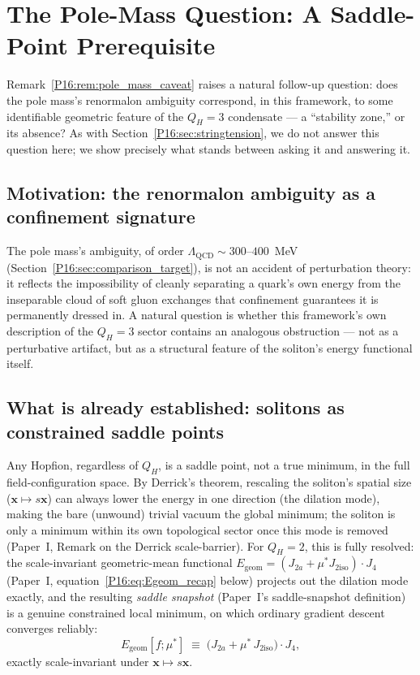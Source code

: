 \documentclass[11pt,a4paper]{article}
\theoremstyle{definition}\newtheorem{definition}[theorem]{Definition}
\theoremstyle{remark}
\theoremstyle{definition}\newtheorem{construction}[theorem]{Construction}
\newcommand{\Ja}{J_{2a}}
\newcommand{\Jfour}{J_4}
\newcommand{\ms}{\mu^*}
\newcommand{\QH}{Q_H}
\newcommand{\Jiso}{J_{2\mathrm{iso}}}
\begin{document}
\section{The Pole-Mass Question: A Saddle-Point Prerequisite}
\label{P16:sec:saddle_prerequisite}

Remark~\ref{P16:rem:pole_mass_caveat} raises a natural follow-up question:
does the pole mass's renormalon ambiguity correspond, in this
framework, to some identifiable geometric feature of the $\QH=3$
condensate --- a ``stability zone,'' or its absence? As with
Section~\ref{P16:sec:stringtension}, we do not answer this question here;
we show precisely what stands between asking it and answering it.

\subsection{Motivation: the renormalon ambiguity as a confinement
  signature}

The pole mass's ambiguity, of order $\Lambda_{\mathrm{QCD}}\sim300$--$400$~MeV
(Section~\ref{P16:sec:comparison_target}), is not an accident of
perturbation theory: it reflects the impossibility of cleanly
separating a quark's own energy from the inseparable cloud of soft
gluon exchanges that confinement guarantees it is permanently dressed
in. A natural question is whether this framework's own description
of the $\QH=3$ sector contains an analogous obstruction --- not as a
perturbative artifact, but as a structural feature of the soliton's
energy functional itself.

\subsection{What is already established: solitons as constrained
  saddle points}

Any Hopfion, regardless of $\QH$, is a saddle point, not a true
minimum, in the full field-configuration space. By Derrick's theorem,
rescaling the soliton's spatial size ($\mathbf{x}\mapsto s\mathbf{x}$)
can always lower the energy in one direction (the dilation mode),
making the bare (unwound) trivial vacuum the global minimum; the soliton is only a
minimum within its own topological sector once this mode is removed
(Paper~I, Remark on the Derrick scale-barrier). For $\QH=2$, this is
fully resolved: the scale-invariant geometric-mean functional
$E_{\mathrm{geom}}=(\Ja+\ms\Jiso)\cdot\Jfour$ (Paper~I,
equation~\eqref{P16:eq:Egeom_recap} below) projects out the dilation mode
exactly, and the resulting \emph{saddle snapshot}
(Paper~I's saddle-snapshot definition) is a genuine constrained
local minimum, on which ordinary gradient descent converges reliably:
\begin{equation}
  E_{\mathrm{geom}}[f;\ms] \;\equiv\; \bigl(\Ja+\ms\,\Jiso\bigr)\cdot\Jfour,
  \label{P16:eq:Egeom_recap}
\end{equation}
exactly scale-invariant under $\mathbf{x}\mapsto s\mathbf{x}$.
\end{document}
